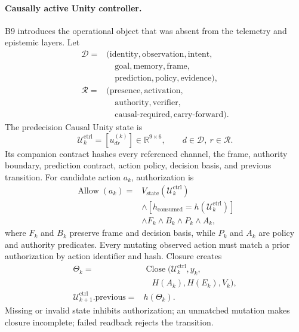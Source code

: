 \documentclass[10pt,twocolumn]{article}
\theoremstyle{definition}
\theoremstyle{plain}
\theoremstyle{remark}
\begin{document}
\paragraph{Causally active Unity controller.}
\label{sec:causal-unity-controller}
B9 introduces the operational object that was absent from the telemetry and epistemic layers.  Let
\[
\begin{aligned}
\mathcal D={}&(\text{identity},\text{observation},\text{intent},\\
&\quad\text{goal},\text{memory},\text{frame},\\
&\quad\text{prediction},\text{policy},\text{evidence}),\\[0.25em]
\mathcal R={}&(\text{presence},\text{activation},\\
&\quad\text{authority},\text{verifier},\\
&\quad\text{causal-required},\text{carry-forward}).
\end{aligned}
\]
The predecision Causal Unity state is
\begin{equation}
\mathcal U^{\mathrm{ctrl}}_k=[u^{(k)}_{dr}]
\in\mathbb R^{9\times6},\qquad d\in\mathcal D,\ r\in\mathcal R.
\label{eq:causal-unity-controller}
\end{equation}
Its companion contract hashes every referenced channel, the frame, authority boundary, prediction contract, action policy, decision basis, and previous transition.  For candidate action $a_k$, authorization is
\begin{equation}
\begin{aligned}
\operatorname{Allow}(a_k)={}&
  V_{\mathrm{state}}(\mathcal U^{\mathrm{ctrl}}_k)\\
&\land[h_{\mathrm{consumed}}=h(\mathcal U^{\mathrm{ctrl}}_k)]\\
&\land F_k\land B_k\land P_k\land A_k,
\end{aligned}
\label{eq:causal-unity-authorization}
\end{equation}
where $F_k$ and $B_k$ preserve frame and decision basis, while $P_k$ and $A_k$ are policy and authority predicates.  Every mutating observed action must match a prior authorization by action identifier and hash.  Closure creates
\begin{equation}
\begin{aligned}
\Theta_k={}&\operatorname{Close}(\mathcal U^{\mathrm{ctrl}}_k,y_k,\\
&\quad H(A_k),H(E_k),V_k),\\
\mathcal U^{\mathrm{ctrl}}_{k+1}.\mathrm{previous}={}&h(\Theta_k).
\end{aligned}
\label{eq:causal-unity-transition}
\end{equation}
Missing or invalid state inhibits authorization; an unmatched mutation makes closure incomplete; failed readback rejects the transition.
\end{document}
